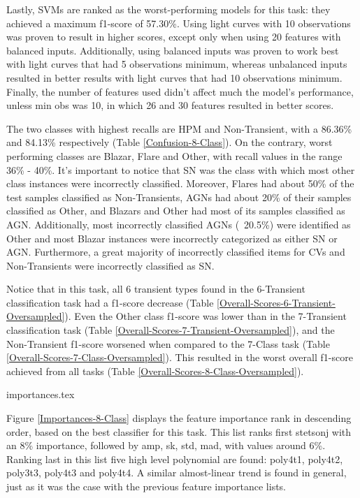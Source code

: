 Lastly, SVMs are ranked as the worst-performing models for this task: they achieved a maximum f1-score of 57.30\%. Using light curves with 10 observations was proven to result in higher scores, except only when using 20 features with balanced inputs. Additionally, using balanced inputs was proven to work best with light curves that had 5 observations minimum, whereas unbalanced inputs resulted in better results with light curves that had 10 observations minimum. Finally, the number of features used didn't affect much the model's performance, unless min \textunderscore obs was 10, in which 26 and 30 features resulted in better scores.

The two classes with highest recalls are HPM and Non-Transient, with a 86.36\% and 84.13\% respectively (Table \ref{Confusion-8-Class}). On the contrary, worst performing classes are Blazar, Flare and Other, with recall values in the range 36\% - 40\%. It's important to notice that SN was the class with which most other class instances were incorrectly classified. Moreover, Flares had about 50\% of the test samples classified as Non-Transients, AGNs had about 20\% of their samples classified as Other, and Blazars and Other had most of  its samples classified as AGN. Additionally, most incorrectly classified AGNs (~20.5\%) were identified as Other and most Blazar instances were incorrectly categorized as either SN or AGN. Furthermore, a great majority of incorrectly classified items for CVs and Non-Transients were incorrectly classified as SN.

Notice that in this task, all 6 transient types found in the 6-Transient classification task had a f1-score decrease (Table \ref{Overall-Scores-6-Transient-Oversampled}). Even the Other class f1-score was lower than in the 7-Transient classification task (Table \ref{Overall-Scores-7-Transient-Oversampled}), and the Non-Transient f1-score worsened when compared to the 7-Class task (Table \ref{Overall-Scores-7-Class-Oversampled}). This resulted in the worst overall f1-score achieved from all tasks (Table \ref{Overall-Scores-8-Class-Oversampled}).

{importances.tex}

Figure \ref{Importances-8-Class} displays the feature importance rank in descending order, based on the best classifier for this task. 
This list ranks first stetson\textunderscore j with an 8\% importance, followed by amp, sk, std, mad, with values around 6\%. Ranking last in this list five high level polynomial are found: poly4\textunderscore t1,  poly4\textunderscore t2, poly3\textunderscore t3, poly4\textunderscore t3 and poly4\textunderscore t4. A similar almost-linear trend is found in general, just as it was the case with the previous feature importance lists.

